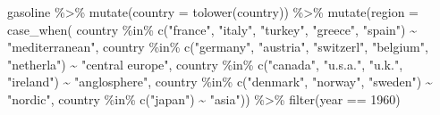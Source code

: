 \documentclass[
]{article}
\newenvironment{Shaded}{\begin{snugshade}}{\end{snugshade}}
\newcommand{\AttributeTok}[1]{\textcolor[rgb]{0.77,0.63,0.00}{#1}}
\newcommand{\DecValTok}[1]{\textcolor[rgb]{0.00,0.00,0.81}{#1}}
\newcommand{\FunctionTok}[1]{\textcolor[rgb]{0.00,0.00,0.00}{#1}}
\newcommand{\NormalTok}[1]{#1}
\newcommand{\SpecialCharTok}[1]{\textcolor[rgb]{0.00,0.00,0.00}{#1}}
\newcommand{\StringTok}[1]{\textcolor[rgb]{0.31,0.60,0.02}{#1}}
\begin{document}
\begin{Shaded}
\begin{Highlighting}[]
\NormalTok{gasoline }\SpecialCharTok{\%\textgreater{}\%}
  \FunctionTok{mutate}\NormalTok{(}\AttributeTok{country =} \FunctionTok{tolower}\NormalTok{(country)) }\SpecialCharTok{\%\textgreater{}\%}
  \FunctionTok{mutate}\NormalTok{(}\AttributeTok{region =} \FunctionTok{case\_when}\NormalTok{(}
\NormalTok{           country }\SpecialCharTok{\%in\%} \FunctionTok{c}\NormalTok{(}\StringTok{"france"}\NormalTok{, }\StringTok{"italy"}\NormalTok{, }\StringTok{"turkey"}\NormalTok{, }\StringTok{"greece"}\NormalTok{, }\StringTok{"spain"}\NormalTok{) }\SpecialCharTok{\textasciitilde{}} \StringTok{"mediterranean"}\NormalTok{,}
\NormalTok{           country }\SpecialCharTok{\%in\%} \FunctionTok{c}\NormalTok{(}\StringTok{"germany"}\NormalTok{, }\StringTok{"austria"}\NormalTok{, }\StringTok{"switzerl"}\NormalTok{, }\StringTok{"belgium"}\NormalTok{, }\StringTok{"netherla"}\NormalTok{) }\SpecialCharTok{\textasciitilde{}} \StringTok{"central europe"}\NormalTok{,}
\NormalTok{           country }\SpecialCharTok{\%in\%} \FunctionTok{c}\NormalTok{(}\StringTok{"canada"}\NormalTok{, }\StringTok{"u.s.a."}\NormalTok{, }\StringTok{"u.k."}\NormalTok{, }\StringTok{"ireland"}\NormalTok{) }\SpecialCharTok{\textasciitilde{}} \StringTok{"anglosphere"}\NormalTok{,}
\NormalTok{           country }\SpecialCharTok{\%in\%} \FunctionTok{c}\NormalTok{(}\StringTok{"denmark"}\NormalTok{, }\StringTok{"norway"}\NormalTok{, }\StringTok{"sweden"}\NormalTok{) }\SpecialCharTok{\textasciitilde{}} \StringTok{"nordic"}\NormalTok{,}
\NormalTok{           country }\SpecialCharTok{\%in\%} \FunctionTok{c}\NormalTok{(}\StringTok{"japan"}\NormalTok{) }\SpecialCharTok{\textasciitilde{}} \StringTok{"asia"}\NormalTok{)) }\SpecialCharTok{\%\textgreater{}\%}
  \FunctionTok{filter}\NormalTok{(year }\SpecialCharTok{==} \DecValTok{1960}\NormalTok{)}
\end{Highlighting}
\end{Shaded}
\end{document}
